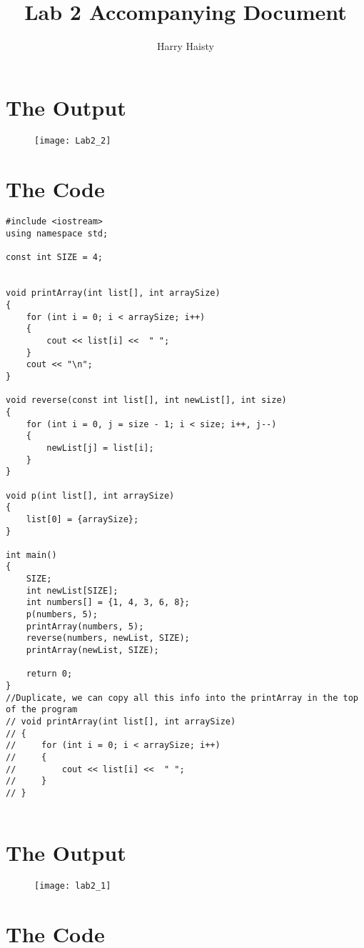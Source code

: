 \documentclass[11pt]{article}
\title{Lab 2 Accompanying Document}
\author{Harry Haisty}
\begin{document}
\maketitle

\section{The Output}

\begin{figure}[H]
    \centering
    \texttt{[image: Lab2\_2]}
\end{figure}


\section{The Code}
\begin{lstlisting}
#include <iostream>
using namespace std;

const int SIZE = 4;


void printArray(int list[], int arraySize)
{
    for (int i = 0; i < arraySize; i++)
    {
        cout << list[i] <<  " ";
    }
	cout << "\n";
}

void reverse(const int list[], int newList[], int size)
{
    for (int i = 0, j = size - 1; i < size; i++, j--)
    {
        newList[j] = list[i];
    }
}

void p(int list[], int arraySize)
{
    list[0] = {arraySize};
}

int main()
{
    SIZE;
    int newList[SIZE];
    int numbers[] = {1, 4, 3, 6, 8};
    p(numbers, 5);
    printArray(numbers, 5);
    reverse(numbers, newList, SIZE);
    printArray(newList, SIZE);

    return 0;
}
//Duplicate, we can copy all this info into the printArray in the top of the program
// void printArray(int list[], int arraySize)
// {
//     for (int i = 0; i < arraySize; i++)
//     {
//         cout << list[i] <<  " ";
//     }
// }


\end{lstlisting}


\section*{The Output}

\begin{figure}[H]
    \centering
    \texttt{[image: lab2\_1]}
\end{figure}
\section*{The Code}
\end{document}
